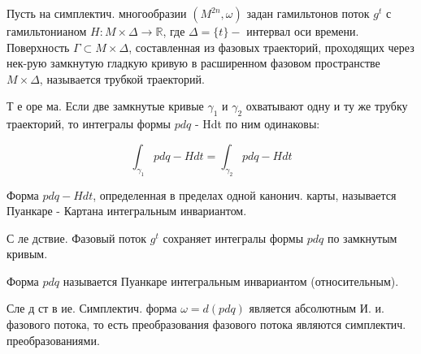 \documentclass[10pt]{article}
\begin{document}
Пусть на симплектич. многообразии $\left(M^{2 n}, \omega\right)$ задан гамильтонов поток $g^{t}$ с гамильтонианом $H: M \times \Delta \rightarrow \mathbb{R}$, где $\Delta=\{t\}-$ интервал оси времени. Поверхность $\Gamma \subset M \times \Delta$, составленная из фазовых траекторий, проходящих через нек-рую замкнутую гладкую кривую в расширенном фазовом пространстве $M \times \Delta$, называется трубкой траекторий.



Т е оре ма. Если две замкнутые кривые $\gamma_{1}$ и $\gamma_{2}$ охватывают одну и ту же трубку траекторий, то интегралы формы $p d q$ - Hdt по ним одинаковы:



\[

\int_{\gamma_{1}} p d q-H d t=\int_{\gamma_{2}} p d q-H d t

\]



Форма $p d q-H d t$, определенная в пределах одной канонич. карты, называется Пуанкаре - Картана интегральным инвариантом.



С ле дствие. Фазовый поток $g^{t}$ сохраняет интегралы формы $p d q$ по замкнутым кривым.



Форма $p d q$ называется Пуанкаре интегральным инвариантом (относительным).



Сле д ст в ие. Симплектич. форма $\omega=d(p d q)$ является абсолютным И. и. фазового потока, то есть преобразования фазового потока являются симплектич. преобразованиями.
\end{document}
